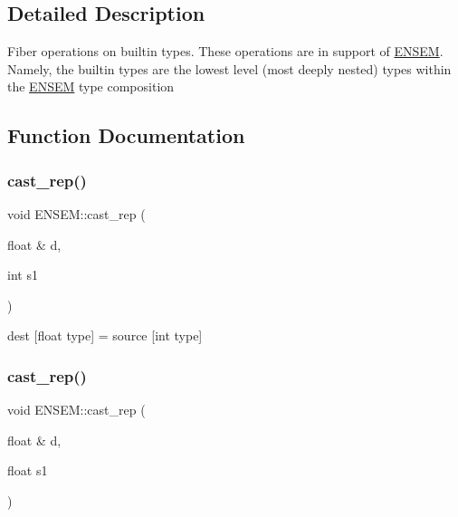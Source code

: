 \subsection{Detailed Description}
Fiber operations on builtin types. These operations are in support of \mbox{\hyperlink{namespaceENSEM}{E\+N\+S\+EM}}. Namely, the builtin types are the lowest level (most deeply nested) types within the \mbox{\hyperlink{namespaceENSEM}{E\+N\+S\+EM}} type composition 

\subsection{Function Documentation}
\mbox{\label{group__simpleword_gabc2c653f0d7a689e3a07dd2cd911dee3}} 
\subsubsection{\texorpdfstring{cast\_rep()}{cast\_rep()}\hspace{0.1cm}{\footnotesize\ttfamily [1/6]}}
{\footnotesize\ttfamily void E\+N\+S\+E\+M\+::cast\+\_\+rep (\begin{DoxyParamCaption}\item[{float \&}]{d,  }\item[{int}]{s1 }\end{DoxyParamCaption})\hspace{0.3cm}{\ttfamily [inline]}}



dest \mbox{[}float type\mbox{]} = source \mbox{[}int type\mbox{]} 

\mbox{\label{group__simpleword_gaa6817877d8caa75bb821988eb6f9bdb8}} 
\subsubsection{\texorpdfstring{cast\_rep()}{cast\_rep()}\hspace{0.1cm}{\footnotesize\ttfamily [2/6]}}
{\footnotesize\ttfamily void E\+N\+S\+E\+M\+::cast\+\_\+rep (\begin{DoxyParamCaption}\item[{float \&}]{d,  }\item[{float}]{s1 }\end{DoxyParamCaption})\hspace{0.3cm}{\ttfamily [inline]}}



